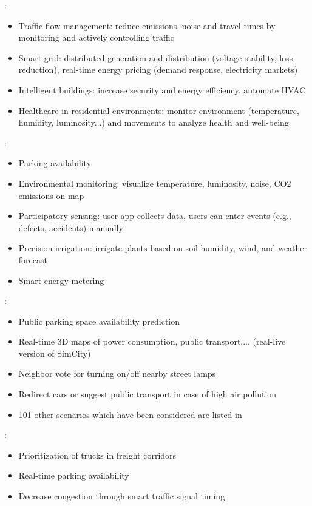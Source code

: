\documentclass[parskip=half]{scrartcl}
\begin{document}
\cite[p.~209~ff.]{Angelakis.2017}:
\begin{itemize}
	\item Traffic flow management: reduce emissions, noise and travel times by monitoring and actively controlling traffic
	\item Smart grid: distributed generation and distribution (voltage stability, loss reduction), real-time energy pricing (demand response, electricity markets)
	\item Intelligent buildings: increase security and energy efficiency, automate HVAC
	\item Healthcare in residential environments:  monitor environment (temperature, humidity, luminosity...) and movements to analyze health and well-being
\end{itemize}

\cite[p.~16]{Fernandes.2012}:
\begin{itemize}
	\item Parking availability
	\item Environmental monitoring: visualize temperature, luminosity, noise, CO2 emissions on map
	\item Participatory sensing: user app collects data, users can enter events (e.g., defects, accidents) manually
	\item Precision irrigation: irrigate plants based on soil humidity, wind, and weather forecast
	\item Smart energy metering
\end{itemize}

\cite[p.~30]{Presser.2014}:
\begin{itemize}
	\item Public parking space availability prediction
	\item Real-time 3D maps of power consumption, public transport,... (real-live version of SimCity)
	\item Neighbor vote for turning on/off nearby street lamps
	\item Redirect cars or suggest public transport in case of high air pollution
	\item 101 other scenarios which have been considered are listed in \cite{CityPulseConsortium.2020}
\end{itemize}

\cite{U.S.DepartmentofTransportation.2016}:
\begin{itemize}
	\item Prioritization of trucks in freight corridors
	\item Real-time parking availability
	\item Decrease congestion through smart traffic signal timing
\end{itemize}
\end{document}
